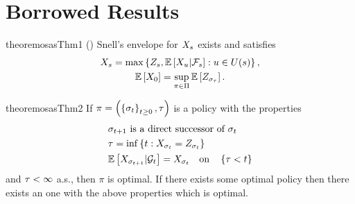 \section{Borrowed Results}

\begin{restatable}{theorem}{osasThm1}
    \label{thm:osas-dp-eq}
    \textup{
        (\citet{mandelbaum1981optimal})
    }
    Snell's envelope for $X_{s}$ exists and satisfies
    \begin{gather*}
        X_{s}
        =
        \max
        \left\{
            Z_{s},
            \mathbb{E}\left[
                X_{u}
                | 
                \mathcal{F}_{s}
            \right]
            : u\in
            U(
                s
            )
        \right\},
        \\
        \mathbb{E}\left[
            X_{0}
        \right]
        =
        \sup_{
            \pi\in\Pi
        }
        \mathbb{E}\left[
            Z_{
                \sigma_{
                    \tau
                }
            }
        \right]
        .
    \end{gather*}  
\end{restatable}

\begin{restatable}{theorem}{osasThm2}
    \label{thm:osas-thm2}
    If
    \(
        \pi
        =
        \left(
            \left\{
                \sigma_{t}
            \right\}_{t\geq 0},
            \tau
        \right)
    \)
    is a policy with the properties
    \begin{align}
        &
        \sigma_{t+1} \text{ is a direct successor of } \sigma_{t}
        \label{eq:osas-thm2-cond1}
        \\
        &
        \tau
        =
        \inf\left\{
            t : 
            X_{
                \sigma_{t}
            }
            =
            Z_{
                \sigma_{t}
            }
        \right\}
        \label{eq:osas-thm2-cond2}
        \\
        &
        \mathbb{E}\left[
            X_{
                \sigma_{
                    t+1
                }
            }
            | \mathcal{G}_{t}
        \right]
        =
        X_{
            \sigma_{t}
        }
        \quad
        \text{on}
        \quad
        \left\{\tau<t\right\}
        \label{eq:osas-thm2-cond3}
    \end{align}  
    and $\tau<\infty$ a.s., then $\pi$ is optimal. If there exists 
    some optimal policy then there exists an one with the above properties which is optimal. 
\end{restatable}  